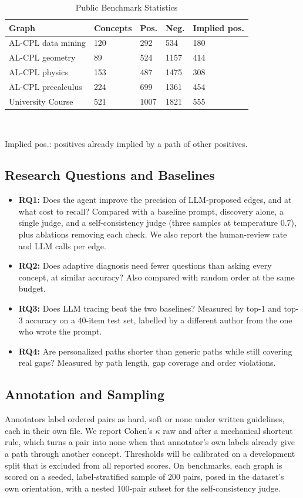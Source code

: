 \documentclass[conference]{IEEEtran}
\begin{document}
\begin{table}[!t]
\caption{Public Benchmark Statistics}
\centering\footnotesize
\begin{tabular}{@{}p{}p{}p{}p{}p{}@{}}
\toprule
\textbf{Graph} & \textbf{Concepts} & \textbf{Pos.} & \textbf{Neg.} & \textbf{Implied pos.} \\ \midrule
AL-CPL data mining & 120 & 292 & 534 & 180 \\
AL-CPL geometry & 89 & 524 & 1157 & 414 \\
AL-CPL physics & 153 & 487 & 1475 & 308 \\
AL-CPL precalculus & 224 & 699 & 1361 & 454 \\
University Course & 521 & 1007 & 1821 & 555 \\
\bottomrule
\end{tabular}
\\[2pt]\parbox{0.95\columnwidth}{\scriptsize Implied pos.: positives already implied by a path of other positives.}
\end{table}
\subsection{Research Questions and Baselines}
\begin{itemize}
\item \textbf{RQ1:} Does the agent improve the precision of LLM-proposed edges, and at what cost to recall? Compared with a baseline prompt, discovery alone, a single judge, and a self-consistency judge (three samples at temperature 0.7), plus ablations removing each check. We also report the human-review rate and LLM calls per edge.
\item \textbf{RQ2:} Does adaptive diagnosis need fewer questions than asking every concept, at similar accuracy? Also compared with random order at the same budget.
\item \textbf{RQ3:} Does LLM tracing beat the two baselines? Measured by top-1 and top-3 accuracy on a 40-item test set, labelled by a different author from the one who wrote the prompt.
\item \textbf{RQ4:} Are personalized paths shorter than generic paths while still covering real gaps? Measured by path length, gap coverage and order violations.
\end{itemize}
\subsection{Annotation and Sampling}
Annotators label ordered pairs as hard, soft or none under written guidelines, each in their own file. We report Cohen's $\kappa$ \cite{cohen} raw and after a mechanical shortcut rule, which turns a pair into none when that annotator's own labels already give a path through another concept. Thresholds will be calibrated on a development split that is excluded from all reported scores. On benchmarks, each graph is scored on a seeded, label-stratified sample of 200 pairs, posed in the dataset's own orientation, with a nested 100-pair subset for the self-consistency judge.
\end{document}
